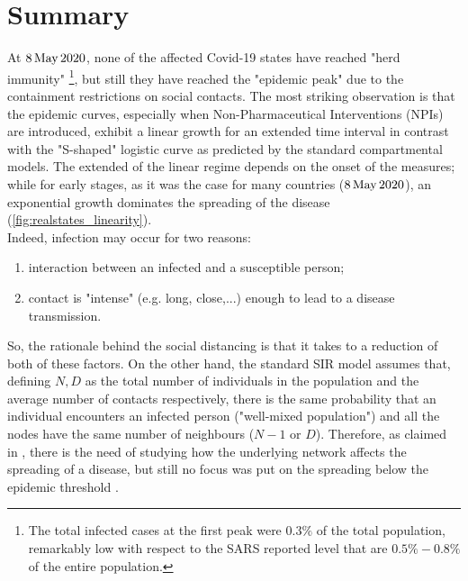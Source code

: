 \documentclass[11pt, a4paper, twoside]{article}
\begin{document}
\section{Summary}
At $8 \, \textnormal{May} \, 2020$, none of the affected Covid-19 states have reached "herd immunity" \footnote{The total infected cases at the first peak were $0.3\%$ of the total population, remarkably low with respect to the SARS reported level that are $0.5\%-0.8\%$ of the entire population.}, but still they have reached the "epidemic peak" due to the containment restrictions on social contacts.
The most striking observation is that the epidemic curves, especially when Non-Pharmaceutical Interventions (NPIs) are introduced, exhibit a linear growth for an extended time interval in contrast with the "S-shaped" logistic curve as predicted by the standard compartmental models. The extended of the linear regime depends on the onset of the measures; while for early stages, as it was the case for many countries \cite{Thurner::NetBasedExpl} ($8 \, \textnormal{May} \, 2020$), an exponential growth dominates the spreading of the disease (\autoref{fig:realstates_linearity}).\\
Indeed, infection may occur for two reasons:
\begin{enumerate}
    \item interaction between an infected and a susceptible person;
    \item contact is "intense" (e.g. long, close,...) enough to lead to a disease transmission.
\end{enumerate}
So, the rationale behind the social distancing is that it takes to a reduction of both of these factors.
On the other hand, the standard SIR model assumes that, defining $N, D$ as the total number of individuals in the population and the average number of contacts respectively, there is the same probability that an individual encounters an infected person ("well-mixed population") and all the nodes have the same number of neighbours ($N-1$ or $D$). Therefore, as claimed in \cite{VespignaniSatorras2001Epidemic}, there is the need of studying how the underlying network affects the spreading of a disease, but still no focus was put on the spreading below the epidemic threshold \cite{Thurner::NetBasedExpl}. 
\end{document}
